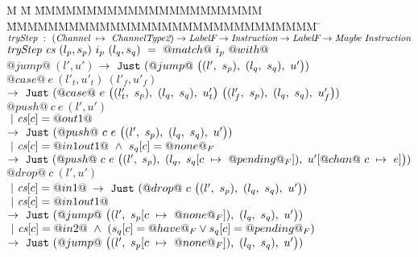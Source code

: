 \begin{figure*}
\begin{tabbing}
M \= M \= MMMMMMMMMMMMMMMMMMMMMM \= MMMMMMMMMMMMMMMMMMMMMMMMMMMMMM \= \kill
$\ti{tryStep} ~:~ \ChanTypeMap \to \LabelF \to \Instr \to \LabelF \to \Maybe~\Instr$ \\
$\ti{tryStep} ~\cs~(l_p,s_p)~i_p~(l_q,s_q)~=~@match@~i_p~@with@$ \\

\> $@jump@~(l',u')$ 
\> \> $\to~\Just (@jump@~
      \nextStep
        {l'}{s_p}
        {l_q}{s_q}
        {u'})
      $ 
\> 
\\[1ex]

\> $@case@~e~(l'_t,u'_t)~(l'_f,u'_f)$
\> \> $\to~\Just (@case@~e~
      \nextStep
        {l'_t}{s_p}
        {l_q}{s_q}
        {u'_t}
      ~
      \nextStep
        {l'_f}{s_p}
        {l_q}{s_q}
        {u'_f})
      $ 
\> 
\\[1ex]

\> $@push@~c~e~(l',u')$ \\
\> \> $~|~\cs[c]=@out1@$ 
\\
\> \> $\to~\Just (@push@~c~e~
      \nextStep
        {l'}
          {s_p}
        {l_q}
          {s_q}
        {u'})
      $ 
\> \> \\

\> \> $~|~\cs[c]=@in1out1@ ~\wedge~ s_q[c]=@none@_F$ 
\\
\> \> $\to~\Just (@push@~c~e~
      \nextStep
        {l'}
          {s_p}
        {l_q}
          {\HeapUpdateOne{c}{@pending@_F}{s_q}}
        {\HeapUpdateOne{@chan@~c}{e}{u'}})
      $
\> \> 
\\[1ex]

\> $@drop@~c~(l',u')$ \\
\> \> $~|~\cs[c]=@in1@$
\> \hspace{2em} $\to~\Just (@drop@~c~
      \nextStep
        {l'}
          {s_p}
        {l_q}
          {s_q}
        {u'})
      $
\>  \\

\> \> $~|~\cs[c]=@in1out1@$
\> \hspace{2em} $\to~\Just (@jump@~
      \nextStep
        {l'}
          {\HeapUpdateOne{c}{@none@_F}{s_p}}
        {l_q}
          {s_q}
        {u'})
      $
\> \\

\> \> $~|~\cs[c]=@in2@ ~\wedge~ (s_q[c]=@have@_F \vee s_q[c]=@pending@_F)$ 
\> \hspace{2em} $\to~\Just (@jump@~
      \nextStep
        {l'}
          {\HeapUpdateOne{c}{@none@_F}{s_p}}
        {l_q}
          {s_q}
        {u'})
      $
\> \\




\end{tabbing}
\end{figure*}
